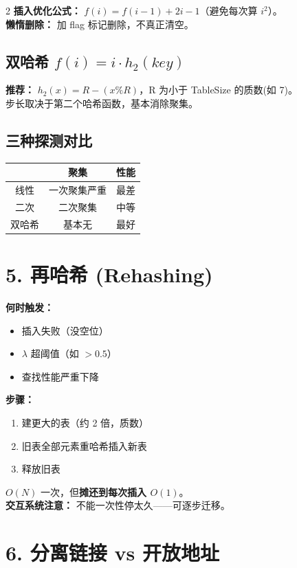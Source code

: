 \documentclass[10pt,a4paper]{article}
\begin{document}
\begin{multicols}{2}
\textbf{插入优化公式：} $f(i)=f(i-1)+2i-1$（避免每次算 $i^2$）。\\
\textbf{懒惰删除：} 加 flag 标记删除，不真正清空。

\subsection*{双哈希 $f(i)=i\cdot h_2(key)$}

\textbf{推荐：} $h_2(x)=R-(x\%R)$，R 为小于 TableSize 的质数(如 7)。\\
步长取决于第二个哈希函数，基本消除聚集。

\subsection*{三种探测对比}

\begin{tabular}{|c|c|c|}
\hline
& \textbf{聚集} & \textbf{性能} \\
\hline
线性 & 一次聚集严重 & 最差 \\
二次 & 二次聚集 & 中等 \\
双哈希 & 基本无 & 最好 \\
\hline
\end{tabular}

\section*{5. 再哈希 (Rehashing)}

\textbf{何时触发：}
\begin{itemize}
\item 插入失败（没空位）
\item $\lambda$ 超阈值（如 $>0.5$）
\item 查找性能严重下降
\end{itemize}

\textbf{步骤：}
\begin{enumerate}
\item 建更大的表（约 2 倍，质数）
\item 旧表全部元素重哈希插入新表
\item 释放旧表
\end{enumerate}

$O(N)$ 一次，但\textbf{摊还到每次插入 $O(1)$}。\\
\textbf{交互系统注意：} 不能一次性停太久——可逐步迁移。

\section*{6. 分离链接 vs 开放地址}


\end{multicols}
\end{document}
